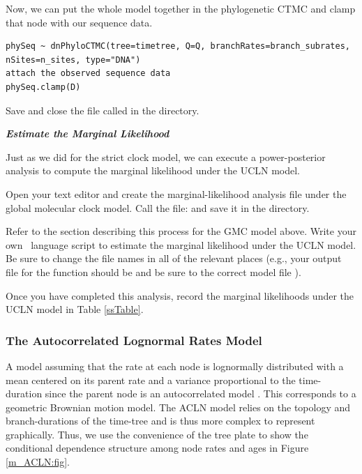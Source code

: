 Now, we can put the whole model together in the phylogenetic CTMC and clamp that node with our sequence data.
{\tt \begin{snugshade*}
\begin{lstlisting}
phySeq ~ dnPhyloCTMC(tree=timetree, Q=Q, branchRates=branch_subrates, nSites=n_sites, type="DNA")
attach the observed sequence data
phySeq.clamp(D)
\end{lstlisting}
\end{snugshade*}}

{\begin{framed}
Save and close the file called {\textcolor{red}{}} in the  directory.
\end{framed}}



\textbf{\textit{Estimate the Marginal Likelihood}}

Just as we did for the strict clock model, we can execute a power-posterior analysis to compute the marginal likelihood under the UCLN model. 

{\begin{framed}
Open your text editor and create the marginal-likelihood analysis file under the global molecular clock model. Call the file: {\textcolor{red}{}} and save it in the  directory.
\end{framed}}

Refer to the section describing this process for the GMC model above.
Write your own \Rev~language script to estimate the marginal likelihood under the UCLN model. 
Be sure to change the file names in all of the relevant places (e.g., your output file for the  function should be \colorbox{shadecolor}{} and be sure to  the correct model file \colorbox{shadecolor}{}).

{\begin{framed}
Once you have completed this analysis, record the marginal likelihoods under the UCLN model in Table \ref{ssTable}.
\end{framed}}

\bigskip
\subsubsection{The Autocorrelated Lognormal Rates Model}

A model assuming that the rate at each node is lognormally distributed with a mean centered on its parent rate and a variance proportional to the time-duration since the parent node is an autocorrelated model \citep[ACLN;][]{thorne98,kishino01,thorne02}. 
This corresponds to a geometric Brownian motion model.
The ACLN model relies on the topology and branch-durations of the time-tree and is thus more complex to represent graphically.
Thus, we use the convenience of the tree plate to show the conditional dependence structure among node rates and ages in Figure \ref{m_ACLN:fig}.

